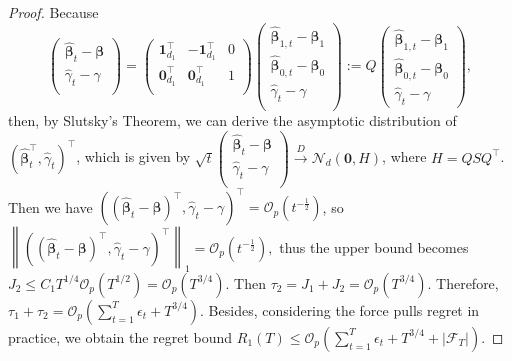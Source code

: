 \documentclass[12pt]{article}
\begin{document}
\begin{proof}
Because
\[
\begin{pmatrix}
        \widehat{\bm{\beta}}_{t}-\bm{\beta}\\
        \widehat{\gamma}_{t} - \gamma\\
\end{pmatrix}
=
\begin{pmatrix}
        \bm{1}_{d_1}^\top & -\bm{1}_{d_1}^\top & 0 \\
        \bm{0}_{d_1}^\top & \bm{0}_{d_1}^\top & 1\\
\end{pmatrix}
\begin{pmatrix}
        \widehat{\bm{\beta}}_{1,t} - \bm{\beta}_1 \\
        \widehat{\bm{\beta}}_{0,t} - \bm{\beta}_0 \\
        \widehat{\gamma}_{t} - \gamma \\
\end{pmatrix}
:= Q
\begin{pmatrix}
        \widehat{\bm{\beta}}_{1,t} - \bm{\beta}_1 \\
        \widehat{\bm{\beta}}_{0,t} - \bm{\beta}_0 \\
        \widehat{\gamma}_{t} - \gamma
\end{pmatrix},
\]
then, by Slutsky's Theorem, we can derive the asymptotic distribution of \( (\widehat{\bm{\beta}}_{t}^{\top}, \widehat{\gamma}_t)^{\top} \), which is given by
$\sqrt{t}
    \begin{pmatrix}
        \widehat{\bm{\beta}}_{t}-\bm{\beta}\\
        \widehat{\gamma}_{t} - \gamma\\
    \end{pmatrix}\stackrel{D}{\to} \mathcal{N}_d (\bm{0}, H)$,
where $H=QSQ^\top$. Then we have 
$\left((\widehat{\bm{\beta}}_{t}-\bm{\beta})^{\top}, \widehat{\gamma}_{t}- \gamma\right)^{\top} = \mathcal{O}_p(t^{-\frac{1}{2}})$, so $\left\|\left((\widehat{\bm{\beta}}_{t}-\bm{\beta})^{\top}, \widehat{\gamma}_{t}- \gamma\right)^{\top} \right\|_1 = \mathcal{O}_p(t^{-\frac{1}{2}}),$ thus the upper bound becomes
$J_2 \le C_1 T^{1/4} \mathcal{O}_p (T^{1/2})=\mathcal{O}_p (T^{3/4})$.
Then $\tau_2 = J_1 +J_2 = \mathcal{O}_p(T^{3/4})$. Therefore, $\tau_1+\tau_2 = \mathcal{O}_p(\sum_{t=1}^T \epsilon_t+T^{3/4})$.
Besides, considering the force pulls regret in practice, we obtain the regret bound $R_1(T) \le \mathcal{O}_p(\sum_{t=1}^T \epsilon_t + T^{3/4}+|\mathcal{F}_T|)$.
\end{proof}
\end{document}

